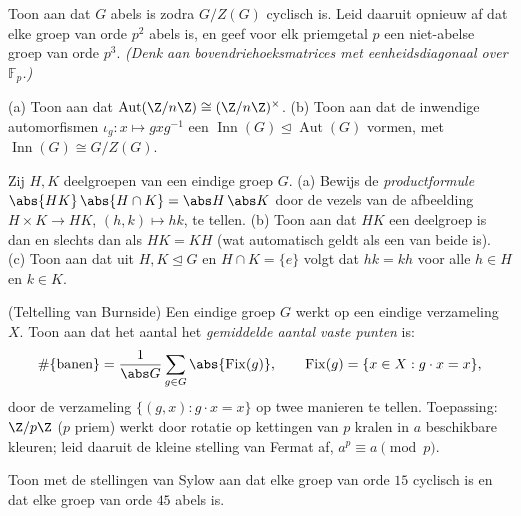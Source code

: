 \begin{exercise}[$\star$]\label{exo:b3:groups:2}
Toon aan dat $G$ abels is zodra $G/Z(G)$ cyclisch is. Leid daaruit
opnieuw af dat elke groep van orde $p^2$ abels is, en geef voor elk
priemgetal $p$ een niet-abelse groep van orde $p^3$. \emph{(Denk
aan bovendriehoeksmatrices met eenheidsdiagonaal over $\mathbb
F_p$.)}
\end{exercise}

\begin{exercise}[$\star$]\label{exo:b3:groups:3}
(a) Toon aan dat $\operatorname{Aut}(\Z/n\Z) \cong
(\Z/n\Z)^\times$.
(b) Toon aan dat de inwendige automorfismen $\iota_g \colon x
\mapsto gxg^{-1}$ een  $\operatorname{Inn}(G)
\trianglelefteq \operatorname{Aut}(G)$ vormen, met
$\operatorname{Inn}(G) \cong G/Z(G)$.
\end{exercise}

\begin{exercise}[$\star\star$]\label{exo:b3:groups:4}
Zij $H, K$ deelgroepen van een eindige groep $G$.
(a) Bewijs de \emph{productformule} $\abs{HK}\,\abs{H\cap K} =
\abs H\, \abs K$ door de vezels van de afbeelding $H \times K \to
HK$, $(h,k) \mapsto hk$, te tellen.
(b) Toon aan dat $HK$ een deelgroep is dan en slechts dan als $HK =
KH$ (wat automatisch geldt als een van beide  is).
(c) Toon aan dat uit $H, K \trianglelefteq G$ en $H \cap K = \{e\}$
volgt dat $hk = kh$ voor alle $h \in H$ en $k \in K$.
\end{exercise}

\begin{exercise}[$\star\star$]\label{exo:b3:groups:5}
(Teltelling van Burnside) Een eindige groep $G$ werkt op een
eindige verzameling $X$. Toon aan dat het aantal  het
\emph{gemiddelde aantal vaste punten} is:
\[
\#\{\text{banen}\} = \frac{1}{\abs G}\sum_{g \in G}
\abs{\operatorname{Fix}(g)},
\qquad \operatorname{Fix}(g) = \{x \in X : g \cdot x = x\},
\]
door de verzameling $\{(g,x) : g\cdot x = x\}$ op twee manieren te
tellen. Toepassing: $\Z/p\Z$ ($p$ priem) werkt door rotatie op
kettingen van $p$ kralen in $a$ beschikbare kleuren; leid daaruit
de kleine stelling van Fermat af, $a^p \equiv a \pmod p$.
\end{exercise}

\begin{exercise}[$\star$]\label{exo:b3:groups:6}
Toon met de stellingen van Sylow aan dat elke groep van orde $15$
cyclisch is en dat elke groep van orde $45$ abels is.
\end{exercise}


